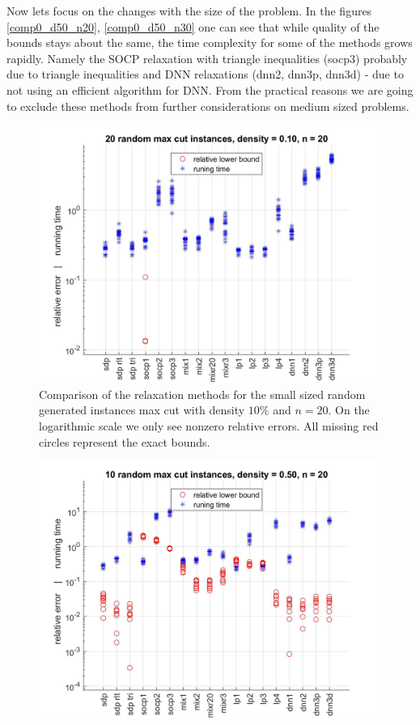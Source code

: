 \documentclass[12pt]{book}
\theoremstyle{definition}
\begin{document}
Now lets focus on the changes with the size of the problem. In the figures \ref{comp0_d50_n20}, \ref{comp0_d50_n30} one can see that while quality of the bounds stays about the same, the time complexity for some of the methods grows rapidly. Namely the SOCP relaxation with triangle inequalities (socp3) probably due to triangle inequalities and DNN relaxations (dnn2, dnn3p, dnn3d) - due to not using an efficient algorithm for DNN. From the practical reasons we are going to exclude these methods from further considerations on medium sized problems.

\begin{center}
\begin{figure}
\includegraphics[scale = 0.27]{img/comp0_d10_n20.jpg}
\caption[Comparison of relaxations - small, sparse instances of max cut]{Comparison of the relaxation methods for the small sized random generated instances max cut with density $10\%$ and $n=20$. On the logarithmic scale we only see nonzero relative errors. All missing red circles represent the exact bounds.}
\label{comp0_d10_n20}
\end{figure}
\begin{figure}
\includegraphics[scale=0.27]{img/comp0_d50_n20.jpg}

\end{figure}
\end{center}
\end{document}
